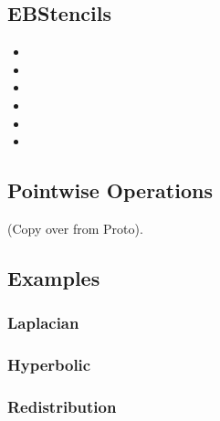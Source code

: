 \documentclass[12pt]{article}
\begin{document}
\subsection{EBStencils}
\begin{itemize}
\item
{}
\item
{}
\item
{}
\item
{}
\item
{}
\item
{}
\end{itemize}

\subsection{Pointwise Operations}
(Copy over from Proto).

\subsection{Examples}
\subsubsection{Laplacian}
\subsubsection{Hyperbolic}
\subsubsection{Redistribution}
\end{document}
